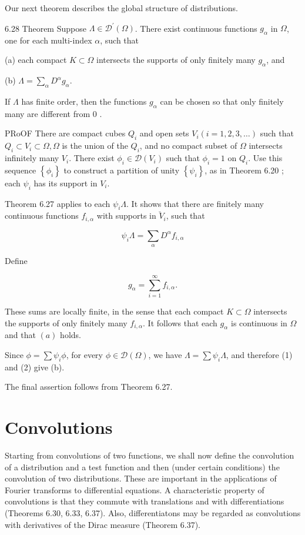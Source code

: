 \documentclass[10pt]{article}
\begin{document}
Our next theorem describes the global structure of distributions.

6.28 Theorem Suppose $\Lambda \in \mathscr{D}^{\prime}(\Omega)$. There exist continuous functions $g_{\alpha}$ in $\Omega$, one for each multi-index $\alpha$, such that

(a) each compact $K \subset \Omega$ intersects the supports of only finitely many $g_{\alpha}$, and

(b) $\Lambda=\sum_{\alpha} D^{\alpha} g_{\alpha}$.

If $\Lambda$ has finite order, then the functions $g_{\alpha}$ can be chosen so that only finitely many are different from 0 .

PRoOF There are compact cubes $Q_{i}$ and open sets $V_{i}(i=1,2,3, \ldots)$ such that $Q_{i} \subset V_{i} \subset \Omega, \Omega$ is the union of the $Q_{i}$, and no compact subset of $\Omega$ intersects infinitely many $V_{i}$. There exist $\phi_{i} \in \mathscr{D}\left(V_{i}\right)$ such that $\phi_{i}=1$ on $Q_{i}$. Use this sequence $\left\{\phi_{i}\right\}$ to construct a partition of unity $\left\{\psi_{i}\right\}$, as in Theorem 6.20 ; each $\psi_{i}$ has its support in $V_{i}$.

Theorem 6.27 applies to each $\psi_{i} \Lambda$. It shows that there are finitely many continuous functions $f_{i, \alpha}$ with supports in $\breve{V}_{i}$, such that

$$
\psi_{i} \Lambda=\sum_{\alpha} D^{\alpha} f_{i, \alpha}
$$

Define

$$
g_{\alpha}=\sum_{i=1}^{\infty} f_{i, \alpha} .
$$

These sums are locally finite, in the sense that each compact $K \subset \Omega$ intersects the supports of only finitely many $f_{i, \alpha}$. It follows that each $g_{\alpha}$ is continuous in $\Omega$ and that $(a)$ holds.

Since $\phi=\sum \psi_{i} \phi$, for every $\phi \in \mathscr{D}(\Omega)$, we have $\Lambda=\sum \psi_{i} \Lambda$, and therefore (1) and (2) give (b).

The final assertion follows from Theorem 6.27.

\section{Convolutions}
Starting from convolutions of two functions, we shall now define the convolution of a distribution and a test function and then (under certain conditions) the convolution of two distributions. These are important in the applications of Fourier transforms to differential equations. A characteristic property of convolutions is that they commute with translations and with differentiations (Theorems 6.30, 6.33, 6.37). Also, differentiatons may be regarded as convolutions with derivatives of the Dirac measure (Theorem 6.37).
\end{document}
